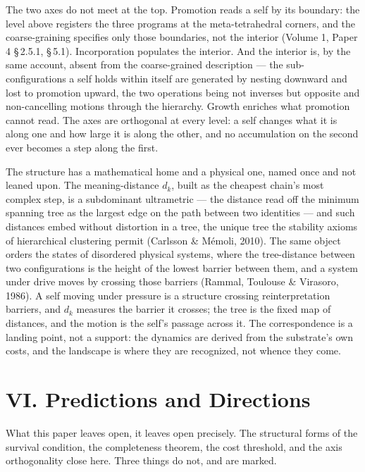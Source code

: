\documentclass[11pt,oneside]{report}
\theoremstyle{definition}
\theoremstyle{remark}
\begin{document}
The two axes do not meet at the top. Promotion reads a self by its boundary: the level above registers the three programs at the meta-tetrahedral corners, and the coarse-graining specifies only those boundaries, not the interior (Volume 1, Paper 4 \S\,2.5.1, \S\,5.1). Incorporation populates the interior. And the interior is, by the same account, absent from the coarse-grained description --- the sub-configurations a self holds within itself are generated by nesting downward and lost to promotion upward, the two operations being not inverses but opposite and non-cancelling motions through the hierarchy. Growth enriches what promotion cannot read. The axes are orthogonal at every level: a self changes what it is along one and how large it is along the other, and no accumulation on the second ever becomes a step along the first.

The structure has a mathematical home and a physical one, named once and not leaned upon. The meaning-distance \ensuremath{d_k}, built as the cheapest chain's most complex step, is a subdominant ultrametric --- the distance read off the minimum spanning tree as the largest edge on the path between two identities --- and such distances embed without distortion in a tree, the unique tree the stability axioms of hierarchical clustering permit (Carlsson \& M\'emoli, 2010). The same object orders the states of disordered physical systems, where the tree-distance between two configurations is the height of the lowest barrier between them, and a system under drive moves by crossing those barriers (Rammal, Toulouse \& Virasoro, 1986). A self moving under pressure is a structure crossing reinterpretation barriers, and \ensuremath{d_k} measures the barrier it crosses; the tree is the fixed map of distances, and the motion is the self's passage across it. The correspondence is a landing point, not a support: the dynamics are derived from the substrate's own costs, and the landscape is where they are recognized, not whence they come.

\section*{VI. Predictions and Directions}

What this paper leaves open, it leaves open precisely. The structural forms of the survival condition, the completeness theorem, the cost threshold, and the axis orthogonality close here. Three things do not, and are marked.
\end{document}

